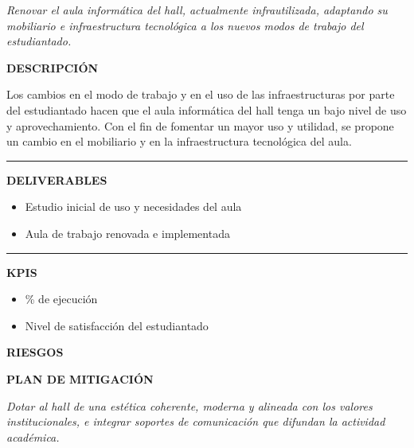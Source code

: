 \documentclass[11pt,a4paper]{scrreprt}
\newcommand{\fieldlabel}[1]{%
  {\footnotesize\sffamily\bfseries\color{mutedcolor}\MakeUppercase{#1}}\par\nopagebreak[4]
}
\newcommand{\fieldsep}{\vspace{3pt}\noindent\textcolor{bordercolor}{\rule{\linewidth}{0.4pt}}\vspace{3pt}\par}
\begin{document}
\newpage
{}
{\small\color{mutedcolor}\itshape Renovar el aula informática del hall, actualmente infrautilizada, adaptando su mobiliario e infraestructura tecnológica a los nuevos modos de trabajo del estudiantado.}\par\vspace{6pt}

\begin{tcolorbox}[pabox={espcolor}{PA2.1 \enspace\textbullet\enspace Renovación del aula de trabajo del hall}]

\fieldlabel{Descripci\'on}
{\small Los cambios en el modo de trabajo y en el uso de las infraestructuras por parte del estudiantado hacen que el aula informática del hall tenga un bajo nivel de uso y aprovechamiento. Con el fin de fomentar un mayor uso y utilidad, se propone un cambio en el mobiliario y en la infraestructura tecnológica del aula.}\par
\fieldsep
\fieldlabel{Deliverables}
{\small \begin{itemize}[noitemsep,topsep=2pt]
\item Estudio inicial de uso y necesidades del aula
\item Aula de trabajo renovada e implementada
\end{itemize}}\par
\fieldsep
\fieldlabel{KPIs}
{\small \begin{itemize}[noitemsep,topsep=2pt]
\item \% de ejecución
\item Nivel de satisfacción del estudiantado
\end{itemize}}\par
\end{tcolorbox}
\begin{tcolorbox}[riskbox]
{\footnotesize\sffamily\bfseries\color{red!50!black} RIESGOS}\par{}
\end{tcolorbox}
\begin{tcolorbox}[mitbox]
{\footnotesize\sffamily\bfseries\color{green!40!black} PLAN DE MITIGACI\'ON}\par{}
\end{tcolorbox}
\vspace{8pt}

\newpage
{}
{\small\color{mutedcolor}\itshape Dotar al hall de una estética coherente, moderna y alineada con los valores institucionales, e integrar soportes de comunicación que difundan la actividad académica.}\par\vspace{6pt}
\end{document}
